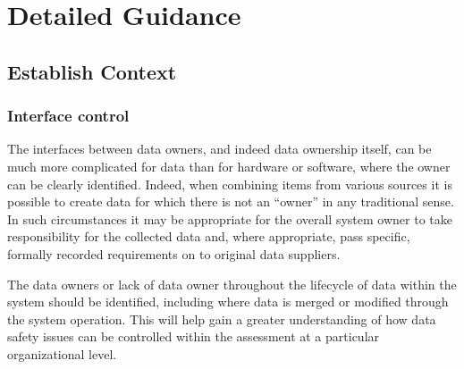 %
%
\chapter{Detailed Guidance} \label{bkm:guidance}


\section{Establish Context}
\subsection{Interface control}
The interfaces between \glspl{data owner}, and indeed data ownership itself, can be much more complicated for data than for hardware or software, where the owner can be clearly identified. Indeed, when combining items from various sources it is possible to create data for which there is not an ``owner'' in any traditional sense. In such circumstances it may be appropriate for the overall system owner to take responsibility for the collected data and, where appropriate, pass specific, formally recorded requirements on to original data suppliers. 

The \glspl{data owner} or lack of data owner throughout the lifecycle of data within the system should be identified, including where data is merged or modified through the system operation. This will help gain a greater understanding of how data safety issues can be controlled within the assessment at a particular organizational level.

